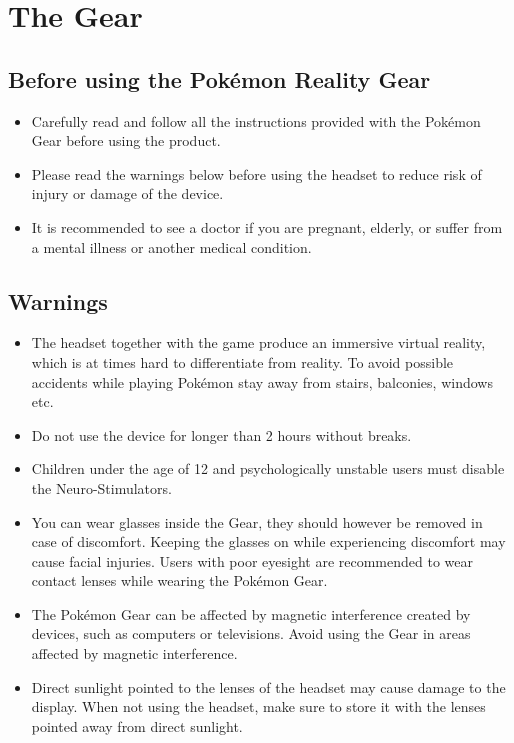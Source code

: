 \chapter{The Gear}

\section{Before using the Pokémon Reality Gear}
\begin{itemize}
\item Carefully read and follow all the instructions provided with the Pokémon Gear before using the product.
\item Please read the warnings below before using the headset to reduce risk of injury or damage of the device.
\item It is recommended to see a doctor if you are pregnant, elderly, or suffer from a mental illness or another medical condition.
\end{itemize}


\section{Warnings}
\begin{itemize}
\item The headset together with the game produce an immersive virtual reality, which is at times hard to differentiate from reality. To avoid possible accidents while playing Pokémon stay away from stairs, balconies, windows etc.
\item Do not use the device for longer than 2 hours without breaks. 
\item Children under the age of 12 and psychologically unstable users must disable the Neuro-Stimulators.
\item You can wear glasses inside the Gear, they should however be removed in case of discomfort. Keeping the glasses on while experiencing discomfort may cause facial injuries. Users with poor eyesight are recommended to wear contact lenses while wearing the Pokémon Gear.
\item The Pokémon Gear can be affected by magnetic interference created by devices, such as computers or televisions. Avoid using the Gear in areas affected by magnetic interference.
\item Direct sunlight pointed to the lenses of the headset may cause damage to the display. When not using the headset, make sure to store it with the lenses pointed away from direct sunlight.
\end{itemize}

